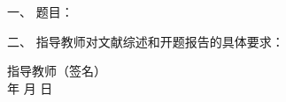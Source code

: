 \newpage

\thispagestyle{empty}


{
\setlength{\parindent}{0em}
\renewcommand{\baselinestretch}{2}
\stfangsong\sihao\bfseries

一、 \; 题目： \; \zjutitlec

\vspace{0.5em}

二、 \; 指导教师对文献综述和开题报告的具体要求：


\vspace*{\fill}
}

{
\stfangsong\xiaosi\bfseries
\begin{flushright}
  指导教师（签名） \; \uwave{\hspace{5em}}  \hspace*{3em}  \\
  \vspace{1em}
  年 \qquad 月 \qquad 日 \hspace*{1em} \hspace*{3em}
\end{flushright}

\vspace{0.5cm}
}

